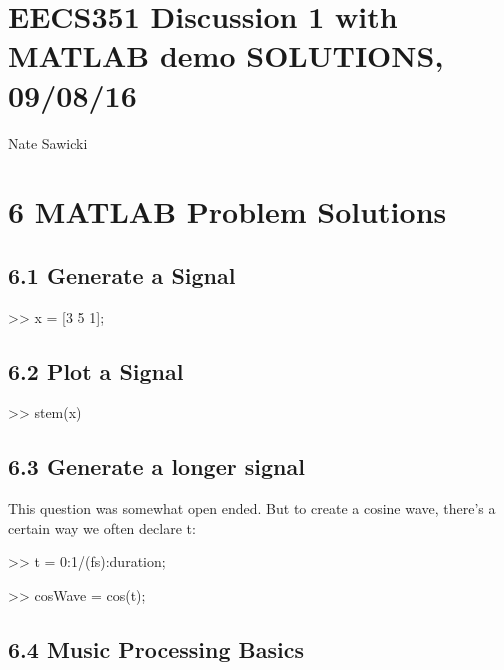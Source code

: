 \documentclass[11pt]{article}
\begin{document}
\section*{EECS351 Discussion 1 with MATLAB demo SOLUTIONS, 09/08/16}
Nate Sawicki

\section*{6 \hspace{3mm} MATLAB Problem Solutions}

\subsection*{6.1 \hspace{3mm} Generate a Signal}
\begin{center}

>> x = [3 5 1];

\end{center}

\subsection*{6.2 \hspace{3mm} Plot a Signal}
\begin{center}

>> stem(x)

\end{center}

\subsection*{6.3 \hspace{3mm} Generate a longer signal}

This question was somewhat open ended. But to create a cosine wave, there's a certain way we often declare t:
\begin{center}

>> t = 0:1/(fs):duration;


\end{center}

\begin{center}


>> cosWave = cos(t);

\end{center}

\subsection*{6.4 \hspace{3mm} Music Processing Basics}
\end{document}
